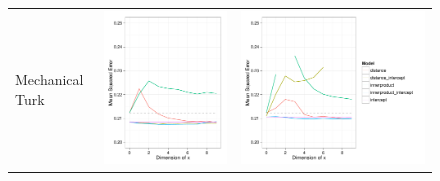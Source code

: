 \begin{figure}
\begin{tabular}{m{2cm}cc}
  \tiny{Mechanical Turk} \vspace{10pt} & \includegraphics[height=0.25\textheight]{chapter_foreign_relations/figures/010_static_model_results.pdf} & \includegraphics[height=0.25\textheight]{chapter_foreign_relations/figures/010_dynamic_model_results.pdf}

\end{tabular}
\end{figure}
